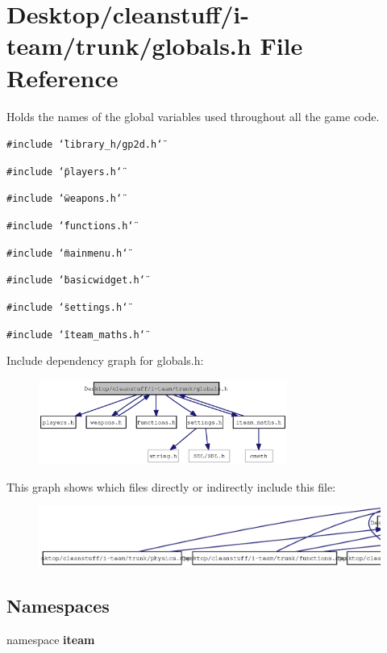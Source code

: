\section{Desktop/cleanstuff/i-team/trunk/globals.h File Reference}
\label{globals_8h}
Holds the names of the global variables used throughout all the game code. 

{\tt \#include \char`\"{}library\_\-h/gp2d.h\char`\"{}}\par
{\tt \#include \char`\"{}players.h\char`\"{}}\par
{\tt \#include \char`\"{}weapons.h\char`\"{}}\par
{\tt \#include \char`\"{}functions.h\char`\"{}}\par
{\tt \#include \char`\"{}mainmenu.h\char`\"{}}\par
{\tt \#include \char`\"{}basicwidget.h\char`\"{}}\par
{\tt \#include \char`\"{}settings.h\char`\"{}}\par
{\tt \#include \char`\"{}iteam\_\-maths.h\char`\"{}}\par


Include dependency graph for globals.h:\nopagebreak
\begin{figure}[H]
\begin{center}
\leavevmode
\includegraphics[width=231pt]{globals_8h__incl}
\end{center}
\end{figure}


This graph shows which files directly or indirectly include this file:\nopagebreak
\begin{figure}[H]
\begin{center}
\leavevmode
\includegraphics[width=420pt]{globals_8h__dep__incl}
\end{center}
\end{figure}
\subsection*{Namespaces}
\begin{CompactItemize}
\item 
namespace {\bf iteam}
\end{CompactItemize}
